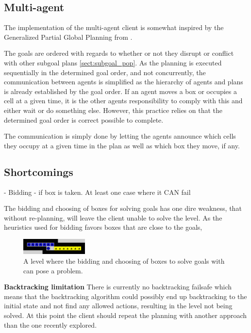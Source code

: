 \documentclass[Main]{subfiles}
\begin{document}
\subsection{Multi-agent} 

The implementation of the multi-agent client is somewhat inspired by the Generalized Partial Global Planning from \cite{Decker, K., Li, J}. 

The goals are ordered with regards to whether or not they disrupt or conflict with other subgoal plans \autoref{sect:subgoal_pop}. As the planning is executed sequentially in the determined goal order, and not concurrently, the communication between agents is simplified as the hierarchy of agents and plans is already established by the goal order. 
If an agent moves a box or occupies a cell at a given time, it is the other agents responsibility to comply with this and either wait or do something else. However, this practice relies on that the determined goal order is correct possible to complete. 

The communication is simply done by letting the agents announce which cells they occupy at a given time in the plan as well as which box they move, if any. 





\subsection{Shortcomings}

- Bidding - if box is taken. At least one case where it CAN fail


The bidding and choosing of boxes for solving goals has one dire weakness, that without re-planning, will leave the client unable to solve the level. As the heuristics used for bidding favors boxes that are close to the goals,


\begin{figure}[h!]
    \centering
    \includegraphics[width=0.3\textwidth]{shortcomings.png}
    \caption{A level where the bidding and choosing of boxes to solve goals with can pose a problem.}
    \label{fig:shortcomings}
\end{figure}



\textbf{Backtracking limitation}
There is currently no backtracking failsafe which means that the backtracking algorithm could possibly end up backtracking to the initial state and not find any allowed actions, resulting in the level not being solved. 
At this point the client should repeat the planning with another approach than the one recently explored. 
\end{document}
